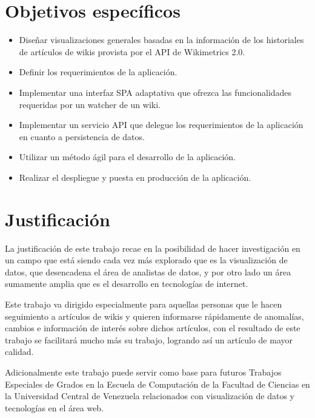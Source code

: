 \section{Objetivos específicos}
\begin{itemize}
\item{Diseñar visualizaciones generales basadas en la información de los historiales de artículos de wikis provista por el API de Wikimetrics 2.0.}
\item{Definir los requerimientos de la aplicación.}
\item{Implementar una interfaz SPA adaptativa que ofrezca las funcionalidades requeridas por un watcher de un wiki.}
\item{Implementar un servicio API que delegue los requerimientos de la aplicación en cuanto a persistencia de datos.}
\item{Utilizar un método ágil para el desarrollo de la aplicación.}
\item{Realizar el despliegue y puesta en producción de la aplicación.}
\end{itemize}

\section{Justificación}
La justificación de este trabajo recae en la posibilidad de hacer investigación en un campo que está siendo cada vez más explorado que es la visualización de datos, que desencadena el área de analistas de datos, y por otro lado un área sumamente amplia que es el desarrollo en tecnologías de internet. 

Este trabajo va dirigido especialmente para aquellas personas que le hacen seguimiento a artículos de wikis y quieren informarse rápidamente de anomalías, cambios e información de interés sobre dichos artículos, con el resultado de este trabajo se facilitará mucho más su trabajo, logrando así un artículo de mayor calidad.

Adicionalmente este trabajo puede servir como base para futuros Trabajos Especiales de Grados en la Escuela de Computación de la Facultad de Ciencias en la Universidad Central de Venezuela relacionados con visualización de datos y tecnologías en el área web.

